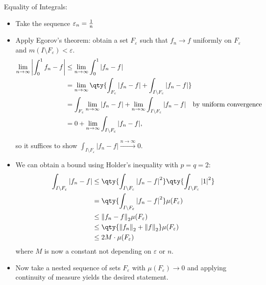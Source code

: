 \begin{solution}

Equality of Integrals:

\begin{itemize}
\item
  Take the sequence \({\varepsilon}_n = {1\over n}\)
\item
  Apply Egorov's theorem: obtain a set \(F_{\varepsilon}\) such that
  \(f_n \to f\) uniformly on \(F_{\varepsilon}\) and
  \(m(I\setminus F_{\varepsilon}) < {\varepsilon}\).
  \begin{align*}
  \lim_{n\to \infty} {\left\lvert { \int_0^1 f_n - f } \right\rvert}
  &\leq \lim_{n\to\infty} \int_0^1 {\left\lvert {f_n - f} \right\rvert} \\
  &= \lim_{n\to\infty} \qty{ \int_{F_{\varepsilon}} {\left\lvert {f_n - f} \right\rvert} + \int_{I\setminus F_{\varepsilon}} {\left\lvert {f_n - f} \right\rvert} } \\
  &= \int_{F_{\varepsilon}} \lim_{n\to\infty} {\left\lvert {f_n - f} \right\rvert} + \lim_{n\to\infty} \int_{I\setminus F_{\varepsilon}} {\left\lvert {f_n - f} \right\rvert} \quad\text{by uniform convergence} \\ 
  &= 0 + \lim_{n\to\infty} \int_{I\setminus F_{\varepsilon}} {\left\lvert {f_n - f} \right\rvert}
  ,\end{align*}

  so it suffices to show
  \(\int_{I\setminus F_{\varepsilon}} {\left\lvert {f_n - f} \right\rvert} \overset{n\to\infty}\to 0\).
\item
  We can obtain a bound using Holder's inequality with \(p=q=2\):
  \begin{align*}
  \int_{I\setminus F_{\varepsilon}} {\left\lvert {f_n - f} \right\rvert} 
  &\leq \qty{ \int_{I\setminus F_{\varepsilon}} {\left\lvert {f_n - f} \right\rvert}^2 } \qty{ \int_{I\setminus F_{\varepsilon}} {\left\lvert {1} \right\rvert}^2  } \\
  &= \qty{ \int_{I\setminus F_{\varepsilon}} {\left\lvert {f_n - f} \right\rvert}^2 } \mu(F_{\varepsilon}) \\
  &\leq {\left\lVert {f_n - f} \right\rVert}_2 \mu(F_{\varepsilon}) \\
  &\leq \qty{ {\left\lVert {f_n} \right\rVert}_2 + {\left\lVert {f} \right\rVert}_2 } \mu(F_{\varepsilon}) \\
  &\leq 2M \cdot \mu(F_{\varepsilon})
  \end{align*}
  where \(M\) is now a constant not depending on \({\varepsilon}\) or
  \(n\).
\item
  Now take a nested sequence of sets \(F_{{\varepsilon}}\) with
  \(\mu(F_{\varepsilon}) \to 0\) and applying continuity of measure
  yields the desired statement.
\end{itemize}

\end{solution}

